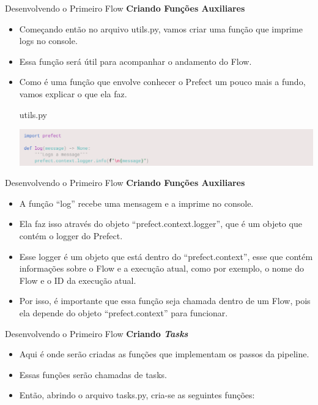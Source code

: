 \documentclass[t,serif]{beamer}
\begin{document}
	\begin{frame}{Desenvolvendo o Primeiro Flow}
		\textbf{Criando Funções Auxiliares}
		\begin{itemize}
			\item Começando então no arquivo utils.py, vamos criar uma função que imprime logs no console.
			\item Essa função será útil para acompanhar o andamento do Flow.
			\item Como é uma função que envolve conhecer o Prefect um pouco mais a fundo, vamos explicar o que ela faz.
			\begin{block}{utils.py}
				\begin{center}
					\includegraphics[width=\linewidth]{figs/2_7.png}
				\end{center}
			\end{block}
		\end{itemize}
	\end{frame}
	
	\begin{frame}{Desenvolvendo o Primeiro Flow}
		\textbf{Criando Funções Auxiliares}
		\begin{itemize}
			\item A função ``log'' recebe uma mensagem e a imprime no console.
			\item Ela faz isso através do objeto ``prefect.context.logger'', que é um objeto que contém o logger do Prefect.
			\item Esse logger é um objeto que está dentro do ``prefect.context'', esse que contém informações sobre o Flow e a execução atual, como por exemplo, o nome do Flow e o ID da execução atual.
			\item Por isso, é importante que essa função seja chamada dentro de um Flow, pois ela depende do objeto ``prefect.context'' para funcionar.
		\end{itemize}
	\end{frame}
	
	\begin{frame}{Desenvolvendo o Primeiro Flow}
		\textbf{Criando \textit{Tasks}}
		\begin{itemize}
			\item Aqui é onde serão criadas as funções que implementam os passos da pipeline.
			\item Essas funções serão chamadas de tasks.
			\item Então, abrindo o arquivo tasks.py, cria-se as seguintes funções:
		\end{itemize}
	\end{frame}
	
\end{document}
